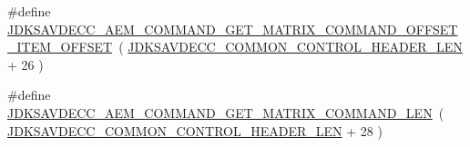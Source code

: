 \begin{DoxyCompactItemize}
\item 
\#define \hyperlink{group__command__get__matrix_gaa9140be8ebdeaa6631910f7f32e4d49c}{J\+D\+K\+S\+A\+V\+D\+E\+C\+C\+\_\+\+A\+E\+M\+\_\+\+C\+O\+M\+M\+A\+N\+D\+\_\+\+G\+E\+T\+\_\+\+M\+A\+T\+R\+I\+X\+\_\+\+C\+O\+M\+M\+A\+N\+D\+\_\+\+O\+F\+F\+S\+E\+T\+\_\+\+I\+T\+E\+M\+\_\+\+O\+F\+F\+S\+ET}~( \hyperlink{group__jdksavdecc__avtp__common__control__header_gaae84052886fb1bb42f3bc5f85b741dff}{J\+D\+K\+S\+A\+V\+D\+E\+C\+C\+\_\+\+C\+O\+M\+M\+O\+N\+\_\+\+C\+O\+N\+T\+R\+O\+L\+\_\+\+H\+E\+A\+D\+E\+R\+\_\+\+L\+EN} + 26 )
\item 
\#define \hyperlink{group__command__get__matrix_ga25f92589e7e01153802fa959751695e7}{J\+D\+K\+S\+A\+V\+D\+E\+C\+C\+\_\+\+A\+E\+M\+\_\+\+C\+O\+M\+M\+A\+N\+D\+\_\+\+G\+E\+T\+\_\+\+M\+A\+T\+R\+I\+X\+\_\+\+C\+O\+M\+M\+A\+N\+D\+\_\+\+L\+EN}~( \hyperlink{group__jdksavdecc__avtp__common__control__header_gaae84052886fb1bb42f3bc5f85b741dff}{J\+D\+K\+S\+A\+V\+D\+E\+C\+C\+\_\+\+C\+O\+M\+M\+O\+N\+\_\+\+C\+O\+N\+T\+R\+O\+L\+\_\+\+H\+E\+A\+D\+E\+R\+\_\+\+L\+EN} + 28 )
\end{DoxyCompactItemize}
